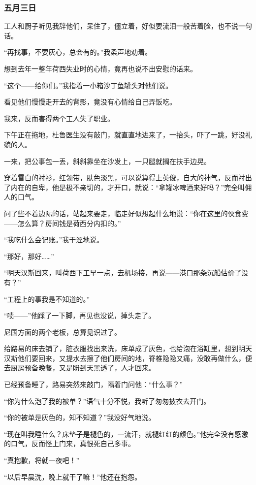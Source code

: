 \subsubsection{五月三日}
\par 工人和厨子听见我辞他们，呆住了，僵立着，好似要流泪一般苦着脸，也不说一句话。
\par “再找事，不要灰心，总会有的。”我柔声地劝着。
\par 想到去年一整年荷西失业时的心情，竟再也说不出安慰的话来。
\par “这个——给你们。”我指着一小箱沙丁鱼罐头对他们说。
\par 看见他们慢慢走开去的背影，竟没有心情给自己弄饭吃。
\par 我来，反而害得两个工人失了职业。
\par 下午正在拖地，杜鲁医生没有敲门，就直直地进来了，一抬头，吓了一跳，好没礼貌的人。
\par 一来，把公事包一丢，斜斜靠坐在沙发上，一只腿就搁在扶手边晃。
\par 穿着雪白的衬衫，红领带，肤色淡黑，可以说算得上英俊，自大的神气，反而衬出了内在的自卑，他是极不亲切的，才开口，就说：“拿罐冰啤酒来好吗？”完全叫佣人的口气。
\par 问了些不着边际的话，站起来要走，临走好似想起什么地说：“你在这里的伙食费——怎么算？房间钱是荷西分内扣的。”
\par “我吃什么会记账。”我干涩地说。
\par “那好，那好……”
\par “明天汉斯回来，叫荷西下工早一点，去机场接，再说——港口那条沉船估价了没有？”
\par “工程上的事我是不知道的。”
\par “啧——”他踩了一下脚，再见也没说，掉头走了。
\par 尼国方面的两个老板，总算见识过了。
\par 给路易的床去铺了，脏衣服找出来洗，床单成了灰色，也给泡在浴缸里，想到明天汉斯他们要回来，又提水去擦了他们房间的地，脊椎隐隐又痛，没敢再做什么，便去厨房预备晚餐，又是盼到天黑透了，人才回来。
\par 已经预备睡了，路易突然来敲门，隔着门问他：“什么事？”
\par “你为什么泡了我的被单？”语气十分不悦，我听了匆匆披衣去开门。
\par “你的被单是灰色的，知不知道？”我没好气地说。
\par “现在叫我睡什么？床垫子是褪色的，一流汗，就褪红红的颜色。”他完全没有感激的口气，反而怪上门来，真恨死自己多事。
\par “真抱歉，将就一夜吧！”
\par “以后早晨洗，晚上就干了嘛！”他还在抱怨。
